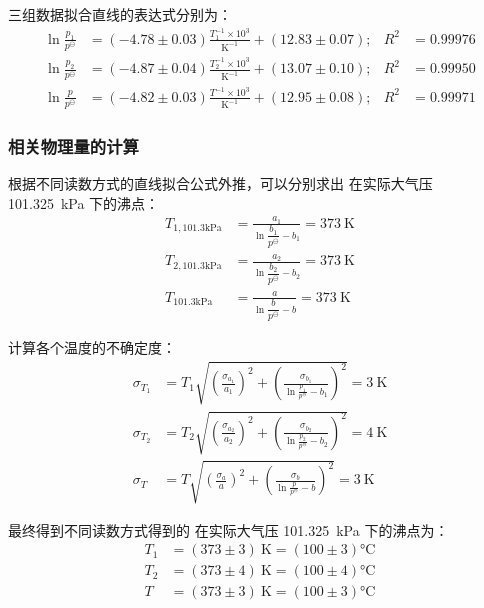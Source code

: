 三组数据拟合直线的表达式分别为：
\begin{align*}
\ln \frac{p_1}{p^\ominus} &= (-4.78 \pm 0.03)\frac{T_1^{-1}\times10^{3}}{\mathrm{K^{-1}}} + (12.83 \pm 0.07); & R^2 &= 0.99976 \\
\ln \frac{p_2}{p^\ominus} &= (-4.87 \pm 0.04)\frac{T_2^{-1}\times10^{3}}{\mathrm{K^{-1}}} + (13.07 \pm 0.10); & R^2 &= 0.99950 \\
\ln \frac{p}{p^\ominus} &= (-4.82 \pm 0.03)\frac{T^{-1}\times10^{3}}{\mathrm{K^{-1}}} + (12.95 \pm 0.08); & R^2 &= 0.99971
\end{align*}

\subsubsection{ 相关物理量的计算}

根据不同读数方式的直线拟合公式外推，可以分别求出  在实际大气压 \SI{101.325}{kPa} 下的沸点：
\begin{align*}
    T_{1,101.3 \mathrm{kPa}} &=\frac{a_1}{\ln \dfrac{b_1}{p^{\ominus}}-b_1}=373 \mathrm{~K} \\
    T_{2,101.3 \mathrm{kPa}} &=\frac{a_2}{\ln \dfrac{b_2}{p^{\ominus}}-b_2}=373 \mathrm{~K} \\
    T_{101.3 \mathrm{kPa}} &=\frac{a}{\ln \dfrac{b}{p^{\ominus}}-b}=373 \mathrm{~K}
\end{align*}

计算各个温度的不确定度：
\begin{align*}
    \sigma_{T_1} &= T_1 \sqrt{\left(\frac{\sigma_{a_1}}{a_1}\right)^2+\left(\frac{\sigma_{b_1}}{\ln \frac{p_1}{p^{\ominus}}-b_1}\right)^2}=3 \mathrm{~K} \\
    \sigma_{T_2} &= T_2 \sqrt{\left(\frac{\sigma_{a_2}}{a_2}\right)^2+\left(\frac{\sigma_{b_2}}{\ln \frac{p_2}{p^{\ominus}}-b_2}\right)^2}=4  \mathrm{~K} \\
    \sigma_{T} &= T \sqrt{\left(\frac{\sigma_{a}}{a}\right)^2+\left(\frac{\sigma_{b}}{\ln \frac{p}{p^{\ominus}}-b}\right)^2}=3 \mathrm{~K}
\end{align*}

最终得到不同读数方式得到的  在实际大气压 \SI{101.325}{kPa} 下的沸点为：
\begin{align*}
    T_1 &= (373\pm3) \mathrm{~K} = (100\pm3)\si{\celsius}\\
    T_2 &= (373\pm4) \mathrm{~K} = (100\pm4)\si{\celsius}\\
    T &= (373\pm3) \mathrm{~K} = (100\pm3)\si{\celsius}
\end{align*}

